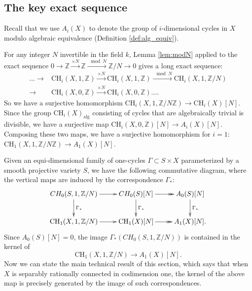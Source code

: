 \documentclass{amsart}
\theoremstyle{definition}
\theoremstyle{remark}
\newcommand{\mbb}{\mathbb}
\newcommand{\ZZ}{\mbb{Z}}
\begin{document}
\subsection{The key exact sequence}
Recall that we use $A_i(X)$ to denote the group of $i$-dimensional cycles in $X$ modulo algebraic equivalence (Definition \ref{def:alg_equiv}). 

For any integer $N$ invertible in the field $k$, 
Lemma \ref{lem:modN} applied to the exact sequence $0 \to \ZZ \xrightarrow{\times N} \ZZ \xrightarrow{\mod N} \ZZ/N \to 0$ gives a long exact sequence:
\begin{align*}
    \ldots \to &\text{CH}_i(X, 1, \ZZ) \xrightarrow{\times N} \text{CH}_i(X, 1, \ZZ) \xrightarrow{\mod N} \text{CH}_i(X, 1, \ZZ/N)\\
    \to &\text{CH}_i(X, 0, \ZZ)\xrightarrow{\times N} \text{CH}_i(X, 0, \ZZ)\ldots.
\end{align*}
So we have a surjective homomorphism
$\text{CH}_i(X, 1, \ZZ/N\ZZ) \to \text{CH}_i(X)[N]$.
Since the group $\text{CH}_i(X)_\text{alg}$ consisting of cycles that are algebraically trivial is divisible, we have a surjective map
$\text{CH}_i(X, 0, \ZZ)[N] \to A_i(X)[N]$.
Composing these two maps, we have a surjective homomorphism for $i=1$:
$\text{CH}_1(X, 1, \ZZ/N \ZZ) \to A_1(X)[N]$.

 
Given an equi-dimensional family of one-cycles $\Gamma\subset S \times X$ parameterized by a smooth projective variety $S$, we have the following commutative diagram, where the vertical maps are induced by the correspondence $\Gamma_*$:
\[
\xymatrix{
 CH_0(S,1, \ZZ/N)\ar[r]\ar[d]^{{\Gamma}_*} & CH_0(S)[N] \ar@{->>}[r]\ar[d]^{{\Gamma}_*} &A_0(S)[N] \ar[d]^{{\Gamma}_*}\\
  \text{CH}_1(X, 1, \ZZ/N) \ar[r] & \text{CH}_1(X)[N] \ar@{->>}[r] & A_1(X)[N].}
\]
Since $A_0(S)[N]=0$, the image ${\Gamma}_*(CH_0(S, 1, \ZZ/N))$ is contained in the kernel of 
\[
\text{CH}_1(X, 1, \ZZ/N) \to A_1(X)[N].
\]
Now we can state the main technical result of this section, which says that when $X$ is separably rationally connected in codimension one, the kernel of the above map is precisely generated by the image of such correspondences.
\end{document}
